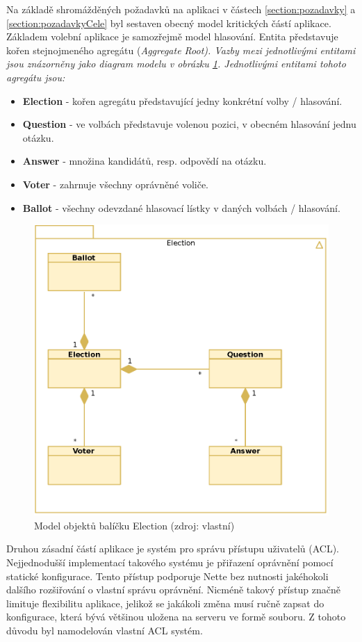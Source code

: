 Na základě shromážděných požadavků na aplikaci v částech \ref{section:pozadavky} a \ref{section:pozadavkyCele} byl sestaven obecný model kritických částí aplikace. Základem volební aplikace je samozřejmě model hlasování. Entita  představuje kořen stejnojmeného agregátu (\it{Aggregate Root}). Vazby mezi jednotlivými entitami jsou znázorněny jako diagram modelu v obrázku \ref{fig:ElectionModel}. Jednotlivými entitami tohoto agregátu jsou: 
\begin{itemize}
	\item \textbf{Election} - kořen agregátu představující jedny konkrétní volby / hlasování.
	\item \textbf{Question} - ve volbách představuje volenou pozici, v obecném hlasování jednu otázku.
	\item \textbf{Answer} - množina kandidátů, resp. odpovědí na otázku.
	\item \textbf{Voter} - zahrnuje všechny oprávněné voliče.
	\item \textbf{Ballot} - všechny odevzdané hlasovací lístky v daných volbách / hlasování.
\end{itemize}

\begin{figure}[h]
	\centering
	\includegraphics[width=0.6\linewidth]{svg/ElectionModelFull.eps}
	\captionsetup{width=0.6\linewidth}
	\caption[Model objektů balíčku Election]{Model objektů balíčku Election (zdroj: vlastní)}
	\label{fig:ElectionModel}
\end{figure}

Druhou zásadní částí aplikace je systém pro správu přístupu uživatelů (ACL). Nejjednodušší implementací takového systému je přiřazení oprávnění pomocí statické konfigurace. Tento přístup podporuje Nette bez nutnosti jakéhokoli dalšího rozšiřování o vlastní správu oprávnění. Nicméně takový přístup značně limituje flexibilitu aplikace, jelikož se jakákoli změna musí ručně zapsat do konfigurace, která bývá většinou uložena na serveru ve formě souboru. Z tohoto důvodu byl namodelován vlastní ACL systém.

